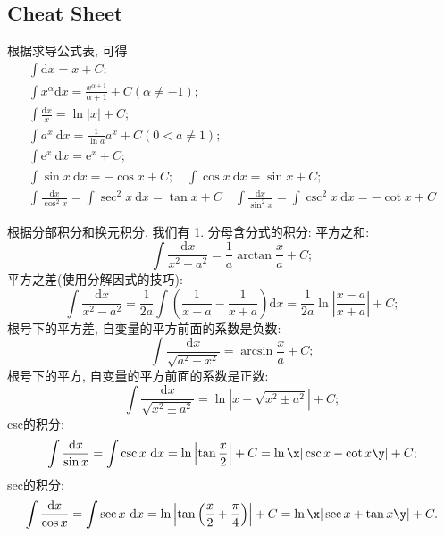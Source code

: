 \subsection{Cheat Sheet}
根据求导公式表, 可得
$$
\begin{array}{l}
    \int \mathrm{d} x=x+C ; \\
    \int x^{\alpha} \mathrm{d} x=\frac{x^{\alpha+1}}{\alpha+1}+C(\alpha \neq-1) ; \\
    \int \frac{\mathrm{d} x}{x}=\ln |x|+C ; \\
    \int a^{x} \mathrm{~d} x=\frac{1}{\ln a} a^{x}+C(0<a \neq 1) ; \\
    \int \mathrm{e}^{x} \mathrm{~d} x=\mathrm{e}^{x}+C ; \\
    \int \sin x \mathrm{~d} x=-\cos x+C ; \quad
    \int \cos x \mathrm{~d} x=\sin x+C ;\\
    \int \frac{\mathrm{d} x}{\cos ^{2} x}=\int \sec ^{2} x \mathrm{~d} x=\tan x+C \quad
    \int \frac{\mathrm{d} x}{\sin ^{2} x}=\int \csc ^{2} x \mathrm{~d} x=-\cot x+C
\end{array}
$$

根据分部积分和换元积分, 我们有
1. 分母含分式的积分:
平方之和:
$$
\int \frac{\mathrm{d} x}{x^{2}+a^{2}}=\frac{1}{a} \arctan \frac{x}{a}+C ;
$$
平方之差(使用分解因式的技巧):
$$
\int \frac{\mathrm{d} x}{x^{2}-a^{2}}=\frac{1}{2 a} \int\left(\frac{1}{x-a}-\frac{1}{x+a}\right) \mathrm{d} x=\frac{1}{2 a} \ln \left|\frac{x-a}{x+a}\right|+C ;
$$
根号下的平方差, 自变量的平方前面的系数是负数:
$$
\int \frac{\mathrm{d} x}{\sqrt{a^{2}-x^{2}}}=\arcsin \frac{x}{a}+C ;
$$
根号下的平方, 自变量的平方前面的系数是正数:
$$
\int \frac{\mathrm{d} x}{\sqrt{x^{2} \pm a^{2}}}=\ln \left|x+\sqrt{x^{2} \pm a^{2}}\right|+C ;
$$
csc的积分:
$$
\int \frac{\mathrm{d} x}{\sin x}=\int \csc x \mathrm{~d} x=\ln \left|\tan \frac{x}{2}\right|+C=\ln \x|\csc x-\cot x \y|+C ;
$$
sec的积分: 
$$
\int \frac{\mathrm{d} x}{\cos x}=\int \sec x \mathrm{~d} x=\ln \left|\tan \left(\frac{x}{2}+\frac{\pi}{4}\right)\right|+C=\ln\x|\sec x + \tan x\y| +C.
$$